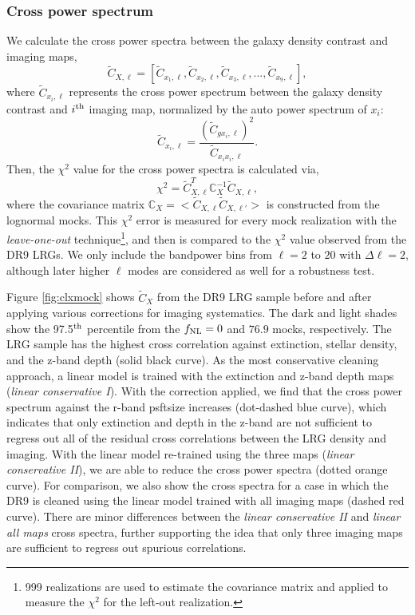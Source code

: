 \subsubsection{Cross power spectrum}

We calculate the cross power spectra between the galaxy density contrast and imaging maps,
\begin{equation}
\tilde{C}_{X, \ell} = [\tilde{C}_{x_{1}, \ell}, \tilde{C}_{x_{2}, \ell}, \tilde{C}_{x_{3}, \ell}, ..., \tilde{C}_{x_{9}, \ell}],
\end{equation}
where $\tilde{C}_{x_{i}, \ell}$ represents the cross power spectrum between the galaxy density contrast and $i^{\rm th}$ imaging map, normalized by the auto power spectrum of $x_{i}$:
\begin{equation}
\tilde{C}_{x_{i}, \ell} = \frac{(\tilde{C}_{gx_{i}, \ell})^{2}}{\tilde{C}_{x_{i}x_{i},\ell}}.
\end{equation}
Then, the $\chi^{2}$ value for the cross power spectra is calculated via,
\begin{equation}
\chi^{2} = \tilde{C}^{T}_{X, \ell} \mathbb{C}_{X}^{-1} \tilde{C}_{X, \ell},
\end{equation}
where the covariance matrix $\mathbb{C}_{X} = < \tilde{C}_{X, \ell} \tilde{C}_{X, \ell'} >$ is constructed from the lognormal mocks. This $\chi^{2}$ error is measured for every mock realization with the \textit{leave-one-out} technique\footnote{999 realizations are used to estimate the covariance matrix and applied to measure the $\chi^{2}$ for the left-out realization.}, and then is compared to the $\chi^{2}$ value observed from the DR9 LRGs. We only include the bandpower bins from $\ell=2$ to $20$ with $\Delta\ell=2$, although later higher $\ell$ modes are considered as well for a robustness test. 

Figure \ref{fig:clxmock} shows $\tilde{C}_{X}$ from the DR9 LRG sample before and after applying various corrections for imaging systematics. The dark and light shades show the 97.5$^{\rm th}$ percentile from the $f_{\rm NL}=0$ and $76.9$ mocks, respectively. The LRG sample has the highest cross correlation against extinction, stellar density, and the z-band depth (solid black curve). As the most conservative cleaning approach, a linear model is trained with the extinction and z-band depth maps (\textit{linear conservative I}). With the correction applied, we find that the cross power spectrum against the r-band psftsize increases (dot-dashed blue curve), which indicates that only extinction and depth in the z-band are not sufficient to regress out all of the residual cross correlations between the LRG density and imaging. With the linear model re-trained using the three maps (\textit{linear conservative II}), we are able to reduce the cross power spectra (dotted orange curve). For comparison, we also show the cross spectra for a case in which the DR9 is cleaned using the linear model trained with all imaging maps (dashed red curve). There are minor differences between the \textit{linear conservative II} and \textit{linear all maps} cross spectra, further supporting the idea that only three imaging maps are sufficient to regress out spurious correlations.

